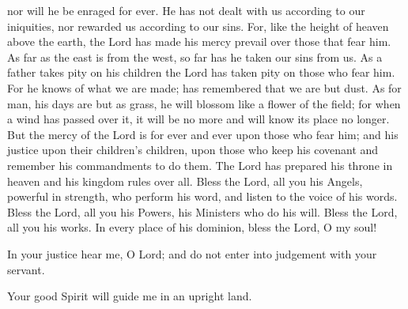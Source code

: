\documentclass{article}
\begin{document}
\begin{service}
\begin{multicols}{2}
{			nor will he be enraged for ever. He has not dealt with us according to our
			iniquities, nor rewarded us according to our sins. For, like the height of
			heaven above the earth, the Lord has made his mercy prevail over those that
			fear him. As far as the east is from the west, so far has he taken our sins from
			us. As a father takes pity on his children the Lord has taken pity on those who
			fear him. For he knows of what we are made; has remembered that we are but dust.
			As for man, his days are but as grass, he will blossom like a flower of the
			field; for when a wind has passed over it, it will be no more and will know its
			place no longer. But the mercy of the Lord is for ever and ever upon those
			who fear him; and his justice upon their children's children, upon those who
			keep his covenant and remember his commandments to do them. The Lord
			has prepared his throne in heaven and his kingdom rules over all. Bless the
			Lord, all you his Angels, powerful in strength, who perform his word, and
			listen to the voice of his words. Bless the Lord, all you his Powers, his
			Ministers who do his will. Bless the Lord, all you his works. In every place
			of his dominion, bless the Lord, O my soul!
			\andagain
			\item In your justice hear me, O Lord; and do not enter into judgement with
			your servant. 
			\item Your good Spirit will guide me in an upright land.
		}
		\rest
		\entry{
			\glorybothnow
			\item \alleluia
		}
	\end{multicols}
	\pagebreak

\end{service}
\end{document}
